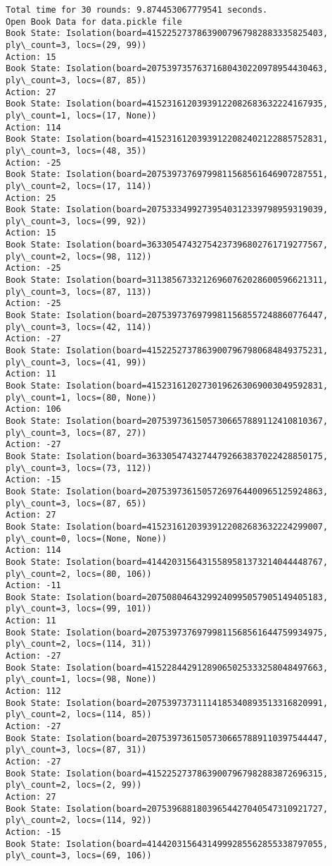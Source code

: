\documentclass[11pt]{article}
\begin{document}
\begin{Verbatim}[commandchars=\\\{\}]
Total time for 30 rounds: 9.874453067779541 seconds.
Open Book Data for data.pickle file
Book State: Isolation(board=41522527378639007967982883335825403, ply\_count=3, locs=(29, 99))
Action: 15
Book State: Isolation(board=20753973576371680430220978954430463, ply\_count=3, locs=(87, 85))
Action: 27
Book State: Isolation(board=41523161203939122082683632224167935, ply\_count=1, locs=(17, None))
Action: 114
Book State: Isolation(board=41523161203939122082402122885752831, ply\_count=3, locs=(48, 35))
Action: -25
Book State: Isolation(board=20753973769799811568561646907287551, ply\_count=2, locs=(17, 114))
Action: 25
Book State: Isolation(board=20753334992739540312339798959319039, ply\_count=3, locs=(99, 92))
Action: 15
Book State: Isolation(board=36330547432754237396802761719277567, ply\_count=2, locs=(98, 112))
Action: -25
Book State: Isolation(board=31138567332126960762028600596621311, ply\_count=3, locs=(87, 113))
Action: -25
Book State: Isolation(board=20753973769799811568557248860776447, ply\_count=3, locs=(42, 114))
Action: -27
Book State: Isolation(board=41522527378639007967980684849375231, ply\_count=3, locs=(41, 99))
Action: 11
Book State: Isolation(board=41523161202730196263069003049592831, ply\_count=1, locs=(80, None))
Action: 106
Book State: Isolation(board=20753973615057306657889112410810367, ply\_count=3, locs=(87, 27))
Action: -27
Book State: Isolation(board=36330547432744792663837022428850175, ply\_count=3, locs=(73, 112))
Action: -15
Book State: Isolation(board=20753973615057269764400965125924863, ply\_count=3, locs=(87, 65))
Action: 27
Book State: Isolation(board=41523161203939122082683632224299007, ply\_count=0, locs=(None, None))
Action: 114
Book State: Isolation(board=41442031564315589581373214044448767, ply\_count=2, locs=(80, 106))
Action: -11
Book State: Isolation(board=20750804643299240995057905149405183, ply\_count=3, locs=(99, 101))
Action: 11
Book State: Isolation(board=20753973769799811568561644759934975, ply\_count=2, locs=(114, 31))
Action: -27
Book State: Isolation(board=41522844291289065025333258048497663, ply\_count=1, locs=(98, None))
Action: 112
Book State: Isolation(board=20753973731114185340893513316820991, ply\_count=2, locs=(114, 85))
Action: -27
Book State: Isolation(board=20753973615057306657889110397544447, ply\_count=3, locs=(87, 31))
Action: -27
Book State: Isolation(board=41522527378639007967982883872696315, ply\_count=2, locs=(2, 99))
Action: 27
Book State: Isolation(board=20753968818039654427040547310921727, ply\_count=2, locs=(114, 92))
Action: -15
Book State: Isolation(board=41442031564314999285562855338797055, ply\_count=3, locs=(69, 106))

\end{Verbatim}
\end{document}
